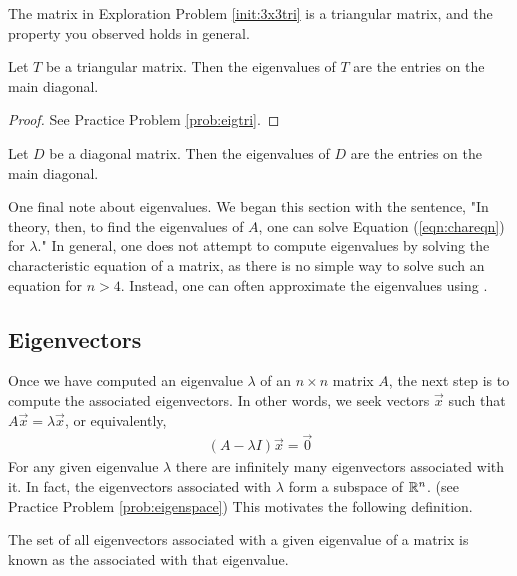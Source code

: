 \documentclass{ximera}
\begin{document}
The matrix in Exploration Problem \ref{init:3x3tri} is a triangular matrix, and the property you observed holds in general.

\begin{theorem}\label{th:eigtri}
Let $T$ be a triangular matrix.  Then the eigenvalues of $T$ are the entries on the main diagonal.
\end{theorem}

\begin{proof}
See Practice Problem \ref{prob:eigtri}.
\end{proof}

\begin{corollary}\label{th:eigdiag}
Let $D$ be a diagonal matrix.  Then the eigenvalues of $D$ are the entries on the main diagonal.
\end{corollary}

One final note about eigenvalues.  We began this section with the sentence, "In theory, then, to find the eigenvalues of $A$, one can solve Equation (\ref{eqn:chareqn}) for $\lambda$."  In general, one does not attempt to compute eigenvalues by solving the characteristic equation of a matrix, as there is no simple way to solve such an equation for $n>4$.  Instead, one can often approximate the eigenvalues using .  %

\subsection{Eigenvectors}
Once we have computed an eigenvalue $\lambda$ of an $n \times n$ matrix $A$, the next step is to compute the associated eigenvectors.  In other words, we seek vectors $\vec{x}$ such that $A\vec{x}=\lambda \vec{x}$, or equivalently,
\begin{align}\label{eqn:nullspace}
 (A-\lambda I) \vec{x}=\vec{0}   
\end{align} 
For any given eigenvalue $\lambda$ there are infinitely many eigenvectors associated with it.  In fact, the eigenvectors associated with $\lambda$ form a subspace of $\mathbb{R}^n$. (see Practice Problem \ref{prob:eigenspace})  This motivates the following definition.

\begin{definition}
The set of all eigenvectors associated with a given eigenvalue of a matrix is known as the  associated with that eigenvalue.
\end{definition}
\end{document}
